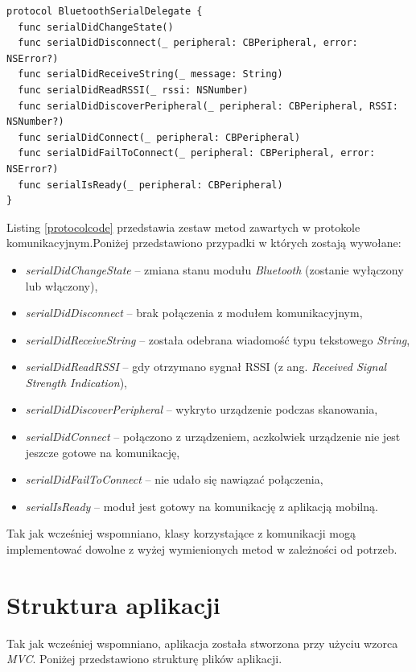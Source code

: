 \begin{minipage}{\textwidth}
	\begin{lstlisting}[label=protocolcode,caption=Protokół odpowiedzialny za komunikację między urządzeniami.]
protocol BluetoothSerialDelegate {
  func serialDidChangeState()
  func serialDidDisconnect(_ peripheral: CBPeripheral, error: NSError?)
  func serialDidReceiveString(_ message: String)
  func serialDidReadRSSI(_ rssi: NSNumber)
  func serialDidDiscoverPeripheral(_ peripheral: CBPeripheral, RSSI: NSNumber?)
  func serialDidConnect(_ peripheral: CBPeripheral)
  func serialDidFailToConnect(_ peripheral: CBPeripheral, error: NSError?)
  func serialIsReady(_ peripheral: CBPeripheral)
}
	\end{lstlisting}
\end{minipage}

Listing \ref{protocolcode} przedstawia zestaw metod zawartych w protokole komunikacyjnym.Poniżej przedstawiono przypadki w których zostają wywołane:

\begin{itemize}
\item \textit{serialDidChangeState} –  zmiana stanu modułu \textit{Bluetooth} (zostanie wyłączony lub włączony),
\item \textit{serialDidDisconnect} –  brak połączenia z modułem komunikacyjnym,
\item \textit{serialDidReceiveString} – została odebrana wiadomość typu tekstowego \textit{String},
\item \textit{serialDidReadRSSI} – gdy otrzymano sygnał RSSI (z ang. \textit{Received Signal Strength Indication}),
\item \textit{serialDidDiscoverPeripheral} – wykryto urządzenie podczas skanowania,
\item \textit{serialDidConnect} – połączono z urządzeniem, aczkolwiek urządzenie nie jest jeszcze gotowe na komunikację,
\item \textit{serialDidFailToConnect} – nie udało się nawiązać połączenia,
\item \textit{serialIsReady} – moduł jest gotowy na komunikację z aplikacją mobilną.
\end{itemize}

Tak jak wcześniej wspomniano, klasy korzystające z komunikacji mogą implementować dowolne z wyżej wymienionych metod w zależności od potrzeb.

\newpage

\section{Struktura aplikacji}
Tak jak wcześniej wspomniano, aplikacja została stworzona przy użyciu wzorca \textit{MVC}. Poniżej przedstawiono strukturę plików aplikacji.

